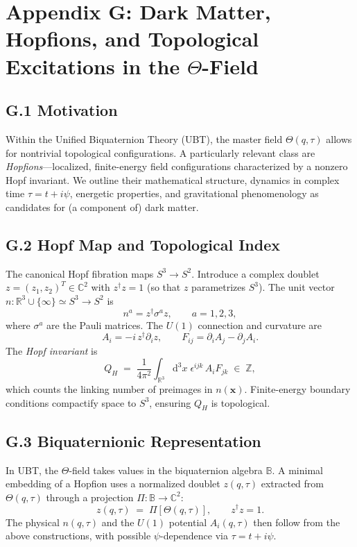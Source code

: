 \appendix
\section{Appendix G: Dark Matter, Hopfions, and Topological Excitations in the $\Theta$-Field}
\subsection*{G.1 Motivation}
Within the Unified Biquaternion Theory (UBT), the master field $\Theta(q,\tau)$ allows for nontrivial topological configurations. 
A particularly relevant class are \emph{Hopfions}---localized, finite-energy field configurations characterized by a nonzero Hopf invariant. 
We outline their mathematical structure, dynamics in complex time $\tau=t+i\psi$, energetic properties, and gravitational phenomenology as candidates for (a component of) dark matter.

\subsection*{G.2 Hopf Map and Topological Index}
The canonical Hopf fibration maps $S^3 \to S^2$. 
Introduce a complex doublet $z=(z_1,z_2)^T\in\mathbb{C}^2$ with $z^\dagger z = 1$ (so that $z$ parametrizes $S^3$). 
The unit vector $n:\mathbb{R}^3\cup\{\infty\}\simeq S^3 \to S^2$ is
\begin{equation}
n^a = z^\dagger \sigma^a z,\qquad a=1,2,3,
\end{equation}
where $\sigma^a$ are the Pauli matrices. The $U(1)$ connection and curvature are
\begin{equation}
A_i = -i\, z^\dagger \partial_i z,\qquad F_{ij} = \partial_i A_j - \partial_j A_i.
\end{equation}
The \emph{Hopf invariant} is
\begin{equation}
Q_H \;=\; \frac{1}{4\pi^2}\int_{\mathbb{R}^3} \mathrm{d}^3x\; \epsilon^{ijk}\, A_i F_{jk} \;\in\; \mathbb{Z},
\end{equation}
which counts the linking number of preimages in $n(\mathbf{x})$. Finite-energy boundary conditions compactify space to $S^3$, ensuring $Q_H$ is topological.

\subsection*{G.3 Biquaternionic Representation}
In UBT, the $\Theta$-field takes values in the biquaternion algebra $\mathbb{B}$. 
A minimal embedding of a Hopfion uses a normalized doublet $z(q,\tau)$ extracted from $\Theta(q,\tau)$ through a projection $\Pi:\mathbb{B}\to\mathbb{C}^2$:
\begin{equation}
z(q,\tau) \;=\; \Pi\!\left[\Theta(q,\tau)\right],\qquad z^\dagger z = 1.
\end{equation}
The physical $n(q,\tau)$ and the $U(1)$ potential $A_i(q,\tau)$ then follow from the above constructions, with possible $\psi$-dependence via $\tau=t+i\psi$.

